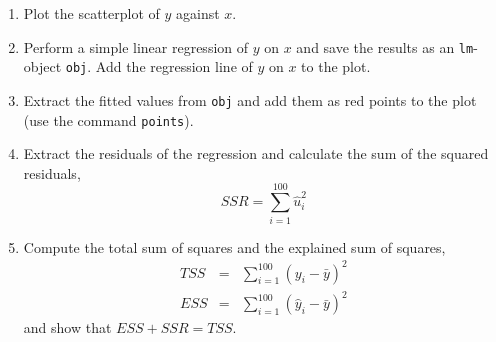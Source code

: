 \documentclass{article}
\begin{document}
\begin{enumerate}
\begin{enumerate}
\item Plot the scatterplot of $y$ against $x$.

\item Perform a simple linear regression of $y$ on $x$ and save the results
as an \texttt{lm}-object \texttt{obj}. Add the regression line of $y$ on $x$
to the plot.

\item Extract the fitted values from \texttt{obj} and add them as red points
to the plot (use the command \texttt{points}).

\item Extract the residuals of the regression and calculate the sum of the
squared residuals,%
\begin{equation*}
SSR=\sum_{i=1}^{100}\hat{u}_{i}^{2}
\end{equation*}

\item Compute the total sum of squares and the explained sum of squares,%
\begin{eqnarray*}
TSS &=&\sum_{i=1}^{100}\left( y_{i}-\bar{y}\right) ^{2} \\
ESS &=&\sum_{i=1}^{100}\left( \hat{y}_{i}-\bar{y}\right) ^{2}
\end{eqnarray*}%
and show that $ESS+SSR=TSS.$
\end{enumerate}


\end{enumerate}
\end{document}
